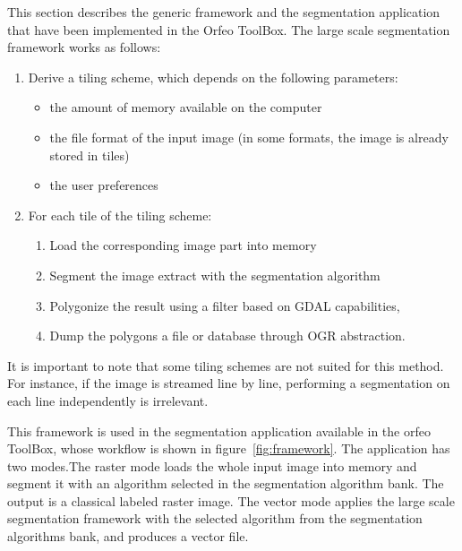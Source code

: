 \documentclass{josis}
\begin{document}
This section describes the generic framework and the segmentation
application that have been implemented in the Orfeo ToolBox. The large
scale segmentation framework works as follows:
\begin{enumerate}[1 - ]
\item Derive a tiling scheme, which depends on the following
  parameters:
\begin{itemize}
\item the amount of memory available on the computer
\item the file format of the input image (in some formats,
the image is already stored in tiles)
\item the user preferences
\end{itemize}
\item For each tile of the tiling scheme:
\begin{enumerate}[a - ]
\item Load the corresponding image part into memory
\item Segment the image extract with the segmentation algorithm
\item Polygonize the result using a filter based on GDAL capabilities,
\item Dump the polygons a file or database through OGR
      abstraction.
\end{enumerate}
\end{enumerate}

It is important to note that some tiling schemes are not suited for
this method. For instance, if the image is streamed line by line,
performing a segmentation on each line independently is irrelevant.

This framework is used in the segmentation application available in
the orfeo ToolBox, whose workflow is shown in
figure~\ref{fig:framework}. The application has two modes.The raster
mode loads the whole input image into memory and segment it with an
algorithm selected in the segmentation algorithm bank. The output is a
classical labeled raster image. The vector mode applies the large
scale segmentation framework with the selected algorithm from the
segmentation algorithms bank, and produces a vector file.
\end{document}
